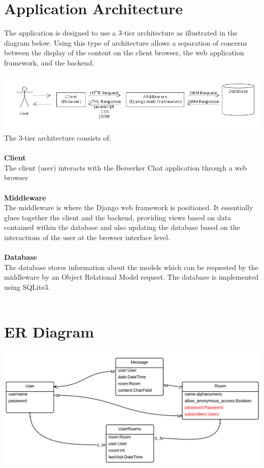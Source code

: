 \documentclass{sig-alt-release2}
\begin{document}
\section{Application Architecture}
The application is designed to use a 3-tier architecture as illustrated in the diagram below. Using this type of architecture allows
a separation of concerns between the display of the content on the client browser, the web application framework, and the backend.

\includegraphics[scale=0.29]{n-tier-arch.png} \\
The 3-tier architecture consists of: \\\\ 
\textbf{Client} \\
The client (user) interacts with the Berserker Chat application through a web browser\\ \\
\textbf{Middleware} \\
The middleware is where the Django web framework is positioned. It essentially glues together the client and the backend, providing views based on data contained within the database and also updating the database based on the interactions of the user at the browser interface level.\\ \\
\textbf{Database} \\
The database stores information about the models which can be requested by the middleware by an Object Relational Model request. The database is implemented using SQLite3.\\ \\

\section{ER Diagram}
\includegraphics[scale=0.2]{er.png}
\end{document}
